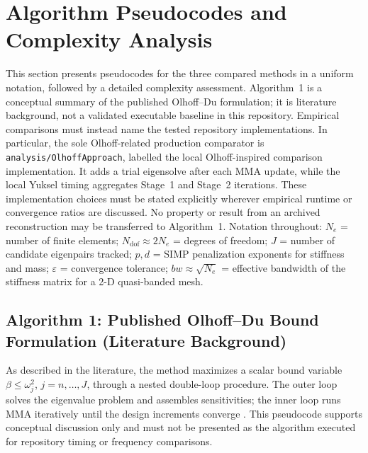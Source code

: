 \documentclass[12pt,a4paper]{article}
\begin{document}
\newpage
\section{Algorithm Pseudocodes and Complexity Analysis}
\label{sec:algorithms}

This section presents pseudocodes for the three compared methods in a
uniform notation, followed by a detailed complexity assessment.
Algorithm~1 is a conceptual summary of the published Olhoff--Du formulation;
it is literature background, not a validated executable baseline in this
repository.  Empirical comparisons must instead name the tested repository
implementations.  In particular, the sole Olhoff-related production
comparator is \texttt{analysis/OlhoffApproach}, labelled the local
Olhoff-inspired comparison implementation.  It adds a trial eigensolve after
each MMA update, while the local Yuksel timing aggregates Stage~1 and Stage~2
iterations.  These implementation choices must be stated explicitly
wherever empirical runtime or convergence ratios are discussed.  No property
or result from an archived reconstruction may be transferred to
Algorithm~1.
Notation throughout: $N_e$ = number of finite elements;
$N_\mathrm{dof} \approx 2N_e$ = degrees of freedom;
$J$ = number of candidate eigenpairs tracked;
$p,d$ = SIMP penalization exponents for stiffness and mass;
$\varepsilon$ = convergence tolerance;
$bw \approx \sqrt{N_e}$ = effective bandwidth of the stiffness matrix
for a 2-D quasi-banded mesh.

\subsection{Algorithm 1: Published Olhoff--Du Bound Formulation
(Literature Background)}
\label{subsec:alg-olhoff}

As described in the literature, the method maximizes a scalar bound variable
$\beta \leq \omega_j^2$,
$j = n,\ldots,J$, through a nested double-loop procedure.
The outer loop solves the eigenvalue problem and assembles sensitivities;
the inner loop runs MMA iteratively until the design increments converge
\cite{Olhoff2014}.  This pseudocode supports conceptual discussion only and
must not be presented as the algorithm executed for repository timing or
frequency comparisons.
\end{document}
